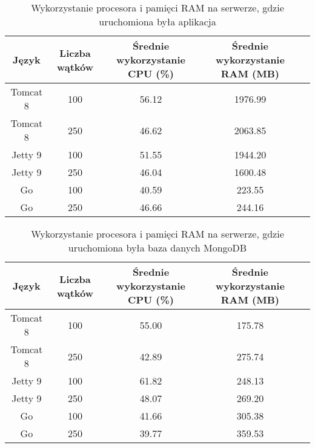 
\begin{table}[!htb]
\centering
\caption{Wykorzystanie procesora i pamięci RAM na serwerze, gdzie uruchomiona była aplikacja}
\label{tab:app-clean-all}
\begin{tabular}{@{}ccccl@{}}
\toprule
\textbf{Język} & \textbf{Liczba wątków} & \multicolumn{1}{p{3cm}}{\textbf{Średnie wykorzystanie CPU (\%)}} & \multicolumn{1}{p{3cm}}{\textbf{Średnie wykorzystanie RAM (MB)}} &  \\ \midrule
Tomcat 8       & 100                    & 56.12                             & 1976.99                          &  \\
Tomcat 8       & 250                    & 46.62                             & 2063.85                          &  \\
Jetty 9       & 100                    & 51.55                             & 1944.20                          &  \\
Jetty 9       & 250                    & 46.04                             & 1600.48                          &  \\
Go       & 100                    & 40.59                             & 223.55                          &  \\
Go       & 250                    & 46.66                             & 244.16                          &  \\
\bottomrule
\end{tabular}
\end{table}


\begin{table}[!htb]
\centering
\caption{Wykorzystanie procesora i pamięci RAM na serwerze, gdzie uruchomiona była baza danych MongoDB}
\label{tab:mongo-clean-all}
\begin{tabular}{@{}ccccl@{}}
\toprule
\textbf{Język} & \textbf{Liczba wątków} & \multicolumn{1}{p{3cm}}{\textbf{Średnie wykorzystanie CPU (\%)}} & \multicolumn{1}{p{3cm}}{\textbf{Średnie wykorzystanie RAM (MB)}} &  \\ \midrule
Tomcat 8       & 100                    & 55.00                             & 175.78                          &  \\
Tomcat 8       & 250                    & 42.89                             & 275.74                          &  \\
Jetty 9       & 100                    & 61.82                             & 248.13                          &  \\
Jetty 9       & 250                    & 48.07                             & 269.20                          &  \\
Go       & 100                    & 41.66                             & 305.38                          &  \\
Go       & 250                    & 39.77                             & 359.53                          &  \\
\bottomrule
\end{tabular}
\end{table}

